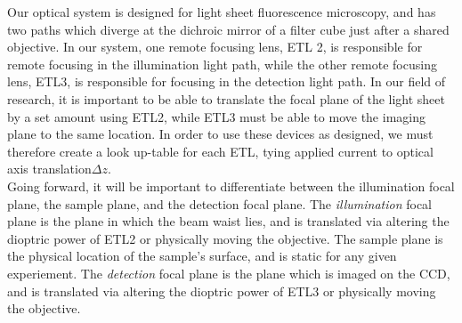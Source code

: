Our optical system is designed for light sheet fluorescence microscopy, and has two paths which diverge at the dichroic mirror of a filter cube just after a shared objective. 
In our system, one remote focusing lens, ETL 2, is responsible for remote focusing in the illumination light path, while the other remote focusing lens, ETL3, is responsible for focusing in the detection light path. In our field of research, it is important to be able to translate the focal plane of the light sheet by a set amount using ETL2, while ETL3 must be able to move the imaging plane to the same location.  In order to use these devices as designed, we must therefore create a look up-table for each ETL, tying applied current to optical axis translation$\Delta z$. \\
Going forward, it will be important to differentiate between the illumination focal plane, the sample plane, and the detection focal plane. The \textit{illumination} focal plane is the plane in which the beam waist lies, and is translated via altering the dioptric power of ETL2 or physically moving the objective. The sample plane is the physical location of the sample's surface, and is static for any given experiement. The \textit{detection} focal plane is the plane which is imaged on the CCD, and is translated via altering the dioptric power of ETL3 or physically moving the objective.\\

